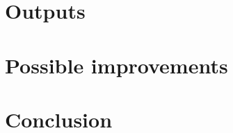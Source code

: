 \documentclass[hidelinks, english]{report}
\begin{document}
\section{Outputs}


\section{Possible improvements}


\section{Conclusion}



\end{document}
